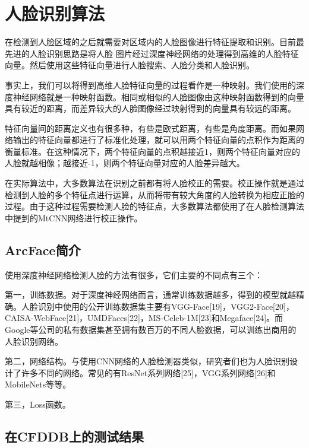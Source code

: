 \chapter{人脸识别算法}
\label{facerecognition}

在检测到人脸区域的之后就需要对区域内的人脸图像进行特征提取和识别。目前最先进的人脸识别思路是将人脸 图片经过深度神经网络的处理得到高维的人脸特征向量。然后使用这些特征向量进行人脸搜索、人脸分类和人脸识别。

事实上，我们可以将得到高维人脸特征向量的过程看作是一种映射。我们使用的深度神经网络就是一种映射函数。相同或相似的人脸图像由这种映射函数得到的向量具有较近的距离，而差异较大的人脸图像经过映射得到的向量具有较远的距离。

特征向量间的距离定义也有很多种，有些是欧式距离，有些是角度距离。而如果网络输出的特征向量都进行了标准化处理，就可以用两个特征向量的点积作为距离的衡量标准。在这种情况下，两个特征向量的点积越接近1，则两个特征向量对应的人脸就越相像；越接近-1，则两个特征向量对应的人脸差异越大。

在实际算法中，大多数算法在识别之前都有将人脸校正的需要。校正操作就是通过检测到人脸的多个特征点进行运算，从而将带有较大角度的人脸转换为相应正脸的过程。由于这种过程需要检测人脸的特征点，大多数算法都使用了在人脸检测算法中提到的MtCNN网络进行校正操作。

\section{ArcFace简介}

使用深度神经网络检测人脸的方法有很多，它们主要的不同点有三个：

第一，训练数据。对于深度神经网络而言，通常训练数据越多，得到的模型就越精确。人脸识别中使用的公开训练数据集主要有VGG-Face[19]，VGG2-Face[20]，CAISA-WebFace[21]，UMDFaces[22]，MS-Celeb-1M[23]和Megaface[24]。而Google等公司的私有数据集甚至拥有数百万的不同人脸数据，可以训练出商用的人脸识别网络。

第二，网络结构。与使用CNN网络的人脸检测器类似，研究者们也为人脸识别设计了许多不同的网络。常见的有ResNet系列网络[25]，VGG系列网络[26]和MobileNets等等。

第三，Loss函数。

\section{在CFDDB上的测试结果}